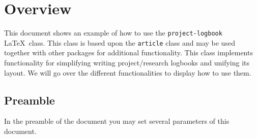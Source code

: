 \documentclass{project-logbook}
\begin{document}

\MakeFrontPage




\section{Overview} \label{sec:introduction}
	This document shows an example of how to use the \texttt{project-logbook} \LaTeX~class. This class is based upon the \texttt{article} class and may be used together with other packages for additional functionality. This class implements functionality for simplifying writing project/research logbooks and unifying its layout. We will  go over the different functionalities to display how to use them.
	
	\subsection{Preamble}
		In the preamble of the document you may set several parameters of this document.
		
\end{document}
